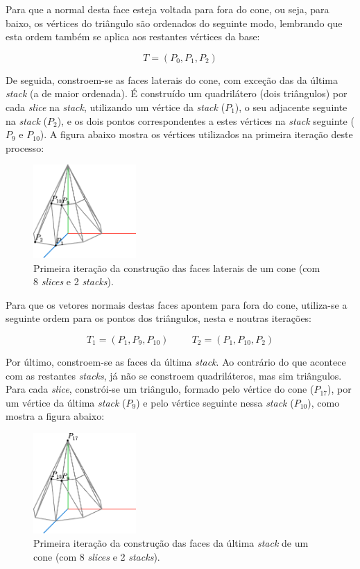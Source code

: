 \documentclass[12pt, a4paper]{article}
\begin{document}
Para que a normal desta face esteja voltada para fora do cone, ou seja, para baixo, os vértices do
triângulo são ordenados do seguinte modo, lembrando que esta ordem também se aplica aos restantes
vértices da base:

$$
T = (P_0, P_1, P_2)
$$

De seguida, constroem-se as faces laterais do cone, com exceção das da última \emph{stack} (a de
maior ordenada). É construído um quadrilátero (dois triângulos) por cada \emph{slice} na
\emph{stack}, utilizando um vértice da \emph{stack} ($P_1$), o seu adjacente seguinte na
\emph{stack} ($P_2$), e os dois pontos correspondentes a estes vértices na \emph{stack} seguinte
($P_9$ e $P_{10}$). A figura abaixo mostra os vértices utilizados na primeira iteração deste
processo:

\begin{figure}[H]
    \centering
    \includegraphics[width=0.35\textwidth]{res/phase1/figures/Cone4.pdf}
    \caption{
        \onehalfspacing
        Primeira iteração da construção das faces laterais de um cone (com 8 \emph{slices} e 2
        \emph{stacks}).
    }
\end{figure}

Para que os vetores normais destas faces apontem para fora do cone, utiliza-se a seguinte ordem para
os pontos dos triângulos, nesta e noutras iterações:

$$
T_1 = (P_1, P_9, P_{10})
\hspace{1cm}
T_2 = (P_1, P_{10}, P_2)
$$

Por último, constroem-se as faces da última \emph{stack}. Ao contrário do que acontece com as
restantes \emph{stacks}, já não se constroem quadriláteros, mas sim triângulos. Para cada
\emph{slice}, constrói-se um triângulo, formado pelo vértice do cone ($P_{17}$), por um vértice da
última \emph{stack} ($P_9$) e pelo vértice seguinte nessa \emph{stack} ($P_{10}$), como mostra a
figura abaixo:

\begin{figure}[H]
    \centering
    \includegraphics[width=0.35\textwidth]{res/phase1/figures/Cone5.pdf}
    \caption{
        \onehalfspacing
        Primeira iteração da construção das faces da última \emph{stack} de um cone (com 8
        \emph{slices} e 2 \emph{stacks}).
    }
\end{figure}
\end{document}
